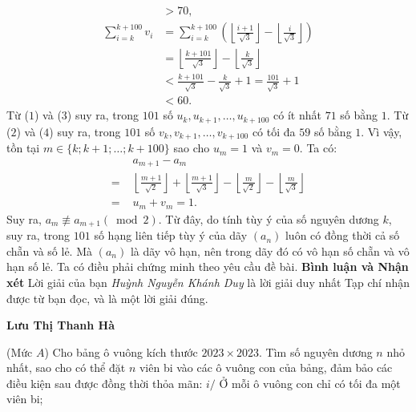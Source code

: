 \begin{multicols}{2}
\begin{align*}
		&> 70, \tag{$3$}\\
		\sum\limits_{i = k}^{k + 100} {{v_i}}  &= \sum\limits_{i = k}^{k + 100} {\left( {\left\lfloor {\frac{{i + 1}}{{\sqrt 3 }}} \right\rfloor  - \left\lfloor {\frac{i}{{\sqrt 3 }}} \right\rfloor } \right)}  \\
		&= \left\lfloor {\frac{{k + 101}}{{\sqrt 3 }}} \right\rfloor  - \left\lfloor {\frac{k}{{\sqrt 3 }}} \right\rfloor \\
		& < \frac{{k + 101}}{{\sqrt 3 }} - \frac{k}{{\sqrt 3 }} + 1 = \frac{{101}}{{\sqrt 3 }} + 1\\
		& < 60. \tag{$4$}
	\end{align*}
	\vskip 0.1cm
	\columnbreak
	Từ ($1$) và ($3$) suy ra, trong $101$ số ${u_k},{u_{k \!+\! 1}},\! \ldots \!,{u_{k \!+\! 100}}$ có ít nhất $71$ số bằng $1$.
	\vskip 0.05cm
	Từ ($2$) và ($4$) suy ra, trong $101$ số ${v_k},{v_{k + 1}}, \ldots ,{v_{k + 100}}$  có tối đa $59$ số bằng $1$.
	\vskip 0.05cm
	Vì vậy, tồn tại $m \in \{k; k + 1; \ldots; k + 100\}$ sao cho $u_m = 1$  và $v_m = 0$.
	\vskip 0.05cm 
	Ta có:
	\begin{align*}
		&{a_{m + 1}} - {a_m}\\
		= &\left\lfloor {\frac{{m + 1}}{{\sqrt 2 }}} \right\rfloor  + \left\lfloor {\frac{{m + 1}}{{\sqrt 3 }}} \right\rfloor  - \left\lfloor {\frac{m}{{\sqrt 2 }}} \right\rfloor  - \left\lfloor {\frac{m}{{\sqrt 3 }}} \right\rfloor  \\
		= \,\,&{u_m} + {v_m} = 1.
	\end{align*}
	Suy ra, ${a_m}\not  \equiv {a_{m + 1}}\left( {\bmod 2} \right).$  Từ đây, do tính tùy ý của số nguyên dương $k$, suy ra, trong $101$ số hạng liên tiếp tùy ý của dãy $\left(a_n\right)$  luôn có đồng thời cả số chẵn và số lẻ. Mà $\left(a_n\right)$  là dãy vô hạn, nên trong dãy đó có vô hạn số chẵn và vô hạn số lẻ. Ta có điều phải chứng minh theo yêu cầu đề bài.
	\vskip 0.05cm
	\textbf{\color{thachthuctoanhoc}Bình luận và Nhận xét}
	\vskip 0.05cm
	Lời giải của bạn \textit{Huỳnh Nguyễn Khánh Duy} là lời giải duy nhất Tạp chí nhận được từ bạn đọc, và là một lời giải đúng.
	\begin{flushright}
		\textbf{\color{thachthuctoanhoc}Lưu Thị Thanh Hà}
	\end{flushright}
	{}
	(Mức $A$) Cho bảng ô vuông kích thước $2023 \times 2023$. Tìm số nguyên dương $n$ nhỏ nhất, sao cho có thể đặt $n$ viên bi vào các ô vuông con của bảng, đảm bảo các điều kiện sau được đồng thời thỏa mãn:
	\vskip 0.05cm
	$i/$ Ở mỗi ô vuông con chỉ có tối đa một viên bi;

\end{multicols}
